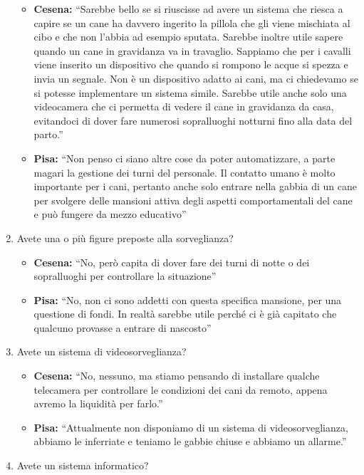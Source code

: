 \documentclass{report}
\begin{document}
\begin{enumerate}
  \begin{itemize}
  \tightlist
  \item
    \textbf{Cesena:} ``Sarebbe bello se si riuscisse ad avere un sistema
    che riesca a capire se un cane ha davvero ingerito la pillola che
    gli viene mischiata al cibo e che non l'abbia ad esempio sputata.
    Sarebbe inoltre utile sapere quando un cane in gravidanza va in
    travaglio. Sappiamo che per i cavalli viene inserito un dispositivo
    che quando si rompono le acque si spezza e invia un segnale. Non è
    un dispositivo adatto ai cani, ma ci chiedevamo se si potesse
    implementare un sistema simile. Sarebbe utile anche solo una
    videocamera che ci permetta di vedere il cane in gravidanza da casa,
    evitandoci di dover fare numerosi sopralluoghi notturni fino alla
    data del parto.''
  \item
    \textbf{Pisa: }``Non penso ci siano altre cose da poter
    automatizzare, a parte magari la gestione dei turni del personale.
    Il contatto umano è molto importante per i cani, pertanto anche solo
    entrare nella gabbia di un cane per svolgere delle mansioni attiva
    degli aspetti comportamentali del cane e può fungere da mezzo
    educativo''
  \end{itemize}
\item
  Avete una o più figure preposte alla sorveglianza?

  \begin{itemize}
  \tightlist
  \item
    \textbf{Cesena:} ``No, però capita di dover fare dei turni di notte
    o dei sopralluoghi per controllare la situazione''
  \item
    \textbf{Pisa: }``No, non ci sono addetti con questa specifica
    mansione, per una questione di fondi. In realtà sarebbe utile perché
    ci è già capitato che qualcuno provasse a entrare di nascosto''
  \end{itemize}
\item
  Avete un sistema di videosorveglianza?

  \begin{itemize}
  \tightlist
  \item
    \textbf{Cesena:} ``No, nessuno, ma stiamo pensando di installare
    qualche telecamera per controllare le condizioni dei cani da remoto,
    appena avremo la liquidità per farlo.''
  \item
    \textbf{Pisa: }``Attualmente non disponiamo di un sistema di
    videosorveglianza, abbiamo le inferriate e teniamo le gabbie chiuse
    e abbiamo un allarme.''
  \end{itemize}
\item
  Avete un sistema informatico?


\end{enumerate}
\end{document}
